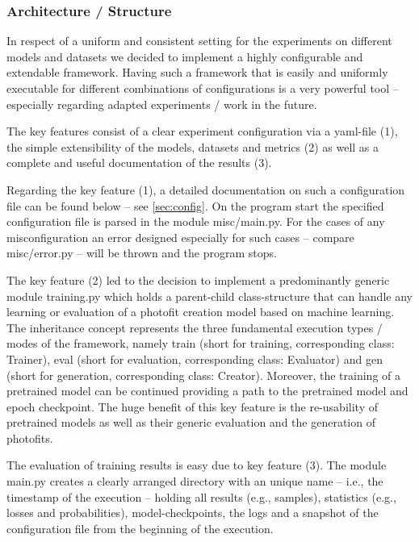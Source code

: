 \documentclass[12pt, a4paper]{article}
\begin{document}
\subsubsection{Architecture / Structure}
In respect of a uniform and consistent setting for the experiments on different models and datasets we decided to
implement a highly configurable and extendable framework.
Having such a framework that is easily and uniformly executable for different combinations of configurations is a very
powerful tool -- especially regarding adapted experiments / work in the future.

The key features consist of a clear experiment configuration via a yaml-file (1), the simple extensibility of the models,
datasets and metrics (2) as well as a complete and useful documentation of the results (3).

Regarding the key feature (1), a detailed documentation on such a configuration file can be found below --
see \ref{sec:config}.
On the program start the specified configuration file is parsed in the module misc/main.py.
For the cases of any misconfiguration an error designed especially for such cases -- compare misc/error.py -- will be
thrown and the program stops.

The key feature (2) led to the decision to implement a predominantly generic module training.py which holds a
parent-child class-structure that can handle any learning or evaluation of a photofit creation model based on machine
learning.
The inheritance concept represents the three fundamental execution types / modes of the framework, namely train
(short for training, corresponding class: Trainer), eval (short for evaluation, corresponding class: Evaluator) and gen
(short for generation, corresponding class: Creator).
Moreover, the training of a pretrained model can be continued providing a path to the pretrained model and epoch
checkpoint.
The huge benefit of this key feature is the re-usability of pretrained models as well as their generic evaluation and
the generation of photofits.

The evaluation of training results is easy due to key feature (3).
The module main.py creates a clearly arranged directory with an unique name -- i.e., the timestamp of the execution --
holding all results (e.g., samples), statistics (e.g., losses and probabilities), model-checkpoints, the logs and a
snapshot of the configuration file from the beginning of the execution.
\end{document}
